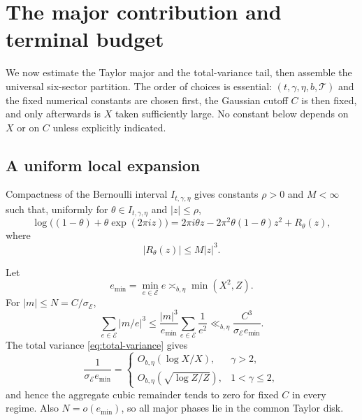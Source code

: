 \section{The major contribution and terminal budget}
\label{sec:major-budget}

We now estimate the Taylor major and the total-variance tail, then assemble the universal six-sector partition.  The order of choices is essential: $(t,\gamma,\eta,b,\mathcal T)$ and the fixed numerical constants are chosen first, the Gaussian cutoff $C$ is then fixed, and only afterwards is $X$ taken sufficiently large.  No constant below depends on $X$ or on $C$ unless explicitly indicated.

\subsection{A uniform local expansion}

Compactness of the Bernoulli interval $I_{t,\gamma,\eta}$ gives constants $\rho>0$ and $M<\infty$ such that, uniformly for $\theta\in I_{t,\gamma,\eta}$ and $|z|\leq\rho$,
\begin{equation}
\label{eq:local-log-expansion}
 \log\bigl((1-\theta)+\theta\exp(2\pi iz)\bigr)
 =2\pi i\theta z
 -2\pi^2\theta(1-\theta)z^2
 +R_\theta(z),
\end{equation}
where
\begin{equation}
\label{eq:local-log-remainder}
 |R_\theta(z)|\leq M|z|^3.
\end{equation}

Let
\[
 e_{\min}=\min_{e\in\mathcal E}e\asymp_{b,\eta}\min(X^2,Z).
\]
For $|m|\leq N=C/\sigma_{\mathcal E}$,
\begin{equation}
\label{eq:aggregate-cubic-general}
 \sum_{e\in\mathcal E}|m/e|^3
 \leq\frac{|m|^3}{e_{\min}}
       \sum_{e\in\mathcal E}\frac1{e^2}
 \ll_{b,\eta}\frac{C^3}{\sigma_{\mathcal E}e_{\min}}.
\end{equation}
The total variance \cref{eq:total-variance} gives
\begin{equation}
\label{eq:aggregate-cubic-remainder}
 \frac1{\sigma_{\mathcal E}e_{\min}}
 =\begin{cases}
 O_{b,\eta}(\log X/X),&\gamma>2,\\
 O_{b,\eta}(\sqrt{\log Z/Z}),&1<\gamma\leq2,
 \end{cases}
\end{equation}
and hence the aggregate cubic remainder tends to zero for fixed $C$ in every regime.  Also $N=o(e_{\min})$, so all major phases lie in the common Taylor disk.

